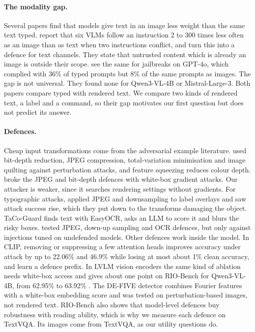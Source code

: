 \documentclass[11pt]{article}
\begin{document}
\paragraph{The modality gap.}
Several papers find that models give text in an image less weight than the same text typed. \citet{zhang2026render} report that six VLMs follow an instruction 2 to 300 times less often as an image than as text when two instructions conflict, and turn this into a defence for text channels. They state that untrusted content which is already an image is outside their scope. \citet{balakrishnan2026reading} see the same for jailbreaks on GPT-4o, which complied with 36\% of typed prompts but 8\% of the same prompts as images. The gap is not universal. They found none for Qwen3-VL-4B or Mistral-Large-3. Both papers compare typed with rendered text. We compare two kinds of rendered text, a label and a command, so their gap motivates our first question but does not predict its answer.

\paragraph{Defences.}
Cheap input transformations come from the adversarial example literature. \citet{guo2018countering} used bit-depth reduction, JPEG compression, total-variation minimisation and image quilting against perturbation attacks, and feature squeezing \citep{xu2018featuresqueezing} reduces colour depth. \citet{athalye2018obfuscated} broke the JPEG and bit-depth defences with white-box gradient attacks. Our attacker is weaker, since it searches rendering settings without gradients. For typographic attacks, \citet{lee2026aigi} applied JPEG and downsampling to label overlays and saw attack success rise, which they put down to the transforms damaging the object. TaCo-Guard \citep{li2026devil} finds text with EasyOCR, asks an LLM to score it and blurs the risky boxes. \citet{chen2026repeat} tested JPEG, down-up sampling and OCR defences, but only against injections tuned on undefended models. Other defences work inside the model. In CLIP, removing or suppressing a few attention heads improves accuracy under attack by up to 22.06\% \citep{hufe2026dyslexify} and 46.9\% \citep{liu2026labelfree} while losing at most about 1\% clean accuracy, and \citet{azuma2023defense} learn a defence prefix. In LVLM vision encoders the same kind of ablation needs white-box access and gives about one point on RIO-Bench for Qwen3-VL-4B, from 62.95\% to 63.92\% \citep{liu2026towards}. The DE-FIVE detector \citep{zhong2026defive} combines Fourier features with a white-box embedding score and was tested on perturbation-based images, not rendered text. RIO-Bench also shows that model-level defences buy robustness with reading ability, which is why we measure each defence on TextVQA. Its images come from TextVQA, as our utility questions do.
\end{document}
